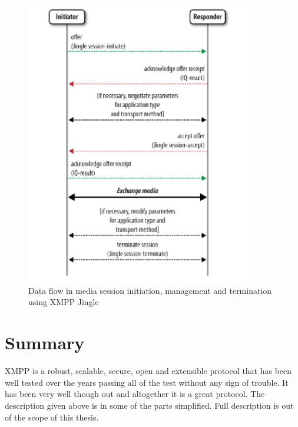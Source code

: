 \begin{figure}[ht]
\begin{center}
	\includegraphics[width=10cm]{fig/xmpp-jingle-flow.png}
	\caption{Data flow in media session initiation, management and termination using XMPP Jingle\cite{xmppBook}}
	\label{fig:xmppJingleDataFlow}
\end{center}
\end{figure}

\section{Summary}
XMPP is a robust, scalable, secure, open and extensible protocol that has been well tested over the years passing all of the test without any sign of trouble. It has been very well though out and altogether it is a great protocol. The description given above is in some of the parts simplified. Full description is out of the scope of this thesis.   



